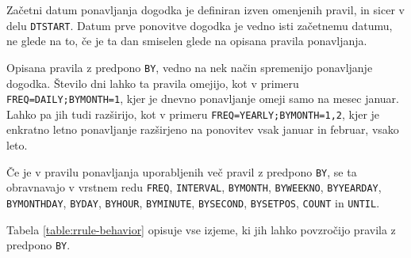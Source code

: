Začetni datum ponavljanja dogodka je definiran izven omenjenih pravil, in sicer v delu \texttt{DTSTART}. Datum prve ponovitve dogodka je vedno isti začetnemu datumu, ne glede na to, če je ta dan smiselen glede na opisana pravila ponavljanja.

Opisana pravila z predpono \texttt{BY}, vedno na nek način spremenijo ponavljanje dogodka. Število dni lahko ta pravila omejijo, kot v primeru \texttt{FREQ=DAILY;BYMONTH=1}, kjer je dnevno ponavljanje omeji samo na mesec januar. Lahko pa jih tudi razširijo, kot v primeru \texttt{FREQ=YEARLY;BYMONTH=1,2}, kjer je enkratno letno ponavljanje razširjeno na ponovitev vsak januar in februar, vsako leto.

Če je v pravilu ponavljanja uporabljenih več pravil z predpono \texttt{BY}, se ta obravnavajo v vrstnem redu \texttt{FREQ}, \texttt{INTERVAL}, \texttt{BYMONTH}, \texttt{BYWEEKNO}, \texttt{BYYEARDAY}, \texttt{BYMONTHDAY}, \texttt{BYDAY}, \texttt{BYHOUR}, \texttt{BYMINUTE}, \texttt{BYSECOND}, \texttt{BYSETPOS}, \texttt{COUNT} in \texttt{UNTIL}.

Tabela \ref{table:rrule-behavior} opisuje vse izjeme, ki jih lahko povzročijo pravila z predpono \texttt{BY}.

\begin{table}
\footnotesize
{}
\caption{Razpredelnica izjem pri uporabi pravil za ponavljanje dogodkov. \textbf{Izjema 1:} omeji če je prisotno pravilo \texttt{BYMONTHDAY}, drugače razširi. \textbf{Izjema 2:} omeji za pravili \texttt{BYYEARDAY} in \texttt{BYMONTHDAY}, drugače razširi. }
\label{table:rrule-behavior}
\end{table}

